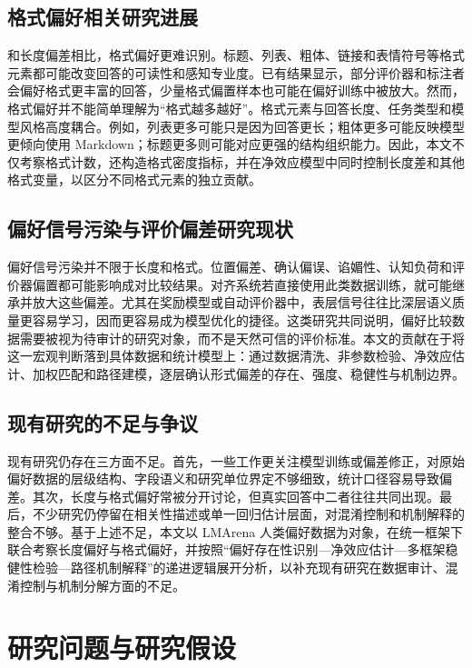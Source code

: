 \documentclass[9pt,a4paper,fontset=windows]{ctexart}
\theoremstyle{definition}
\numberwithin{equation}{section}
\begin{document}
\subsection{格式偏好相关研究进展}
和长度偏差相比，格式偏好更难识别。标题、列表、粗体、链接和表情符号等格式元素都可能改变回答的可读性和感知专业度。已有结果显示，部分评价器和标注者会偏好格式更丰富的回答，少量格式偏置样本也可能在偏好训练中被放大。然而，格式偏好并不能简单理解为“格式越多越好”。格式元素与回答长度、任务类型和模型风格高度耦合。例如，列表更多可能只是因为回答更长；粗体更多可能反映模型更倾向使用 Markdown；标题更多则可能对应更强的结构组织能力。因此，本文不仅考察格式计数，还构造格式密度指标，并在净效应模型中同时控制长度差和其他格式变量，以区分不同格式元素的独立贡献。

\subsection{偏好信号污染与评价偏差研究现状}
偏好信号污染并不限于长度和格式。位置偏差、确认偏误、谄媚性、认知负荷和评价器偏置都可能影响成对比较结果。对齐系统若直接使用此类数据训练，就可能继承并放大这些偏差。尤其在奖励模型或自动评价器中，表层信号往往比深层语义质量更容易学习，因而更容易成为模型优化的捷径。这类研究共同说明，偏好比较数据需要被视为待审计的研究对象，而不是天然可信的评价标准。本文的贡献在于将这一宏观判断落到具体数据和统计模型上：通过数据清洗、非参数检验、净效应估计、加权匹配和路径建模，逐层确认形式偏差的存在、强度、稳健性与机制边界。

\subsection{现有研究的不足与争议}
现有研究仍存在三方面不足。首先，一些工作更关注模型训练或偏差修正，对原始偏好数据的层级结构、字段语义和研究单位界定不够细致，统计口径容易导致偏差。其次，长度与格式偏好常被分开讨论，但真实回答中二者往往共同出现。最后，不少研究仍停留在相关性描述或单一回归估计层面，对混淆控制和机制解释的整合不够。基于上述不足，本文以 LMArena 人类偏好数据为对象，在统一框架下联合考察长度偏好与格式偏好，并按照“偏好存在性识别—净效应估计—多框架稳健性检验—路径机制解释”的递进逻辑展开分析，以补充现有研究在数据审计、混淆控制与机制分解方面的不足。

\section{研究问题与研究假设}
\end{document}

